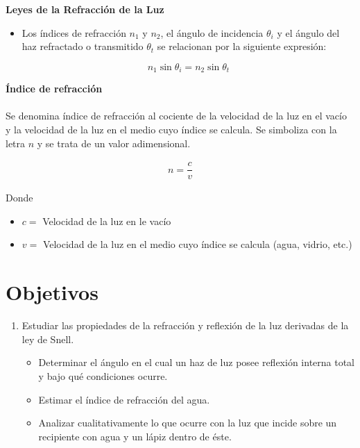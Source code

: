 \documentclass[
aps,
reprint,
amsmath, amssymb,
superscriptaddress,
]{revtex4-2}
\begin{document}
\textbf{Leyes de la Refracción de la Luz}

\begin{itemize}
    \item Los índices de refracción $n_1$ y $n_2$, el ángulo de incidencia $\theta_{i}$ y el ángulo del haz refractado o transmitido $\theta_{t}$ se relacionan por la siguiente expresión:
    
    \begin{equation}
        \label{eqn:ley_snell}
        n_{1} \sin{\theta_{i}} = n_{2} \sin{\theta_{t}} 
    \end{equation}
\end{itemize}

\textbf{Índice de refracción}\\
\\
Se denomina índice de refracción al cociente de la velocidad de la luz en el vacío y la velocidad de la luz en el medio cuyo índice se calcula. Se simboliza con la letra $n$ y se trata de un valor adimensional.

\begin{align}
    n = \dfrac{c}{v}
\end{align}

Donde
\begin{itemize}
    \item $c =$ Velocidad de la luz en le vacío
    \item $v =$ Velocidad de la luz en el medio cuyo índice se calcula (agua, vidrio, etc.)
\end{itemize}


\section{Objetivos}
\begin{enumerate}
    \item Estudiar las propiedades de la refracción y reflexión de la luz derivadas de la ley de Snell.
    \begin{itemize}
        \item Determinar el ángulo en el cual un haz de luz posee reflexión interna total y bajo qué condiciones ocurre.
        \item Estimar el índice de refracción del agua.
        \item Analizar cualitativamente lo que ocurre con la luz que incide sobre un recipiente con agua y un lápiz dentro de éste.
    \end{itemize}
\end{enumerate}
\end{document}
